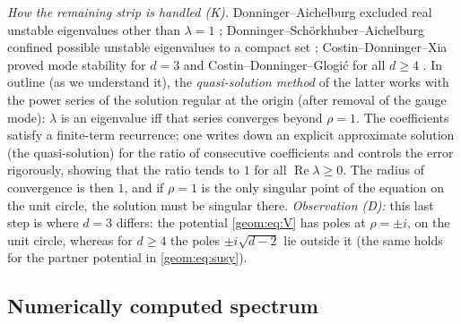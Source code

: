 \emph{How the remaining strip is handled (K).} Donninger--Aichelburg
excluded real unstable eigenvalues other than $\lambda=1$
\cite{DonningerAichelburg2008}; Donninger--Sch\"orkhuber--Aichelburg
confined possible unstable eigenvalues to a compact set
\cite{DonningerSchoerkhuberAichelburg2012}; Costin--Donninger--Xia proved
mode stability for $d=3$ \cite{CostinDonningerXia2016} and
Costin--Donninger--Glogi\'c for all $d\ge4$ \cite{CostinDonningerGlogic2017}.
In outline (as we understand it), the \emph{quasi-solution method} of the
latter works with the power series of the solution regular at the origin
(after removal of the gauge mode): $\lambda$ is an eigenvalue iff that series
converges beyond $\rho=1$. The coefficients satisfy a finite-term
recurrence; one writes down an explicit approximate solution (the
quasi-solution) for the ratio of consecutive coefficients and controls the
error rigorously, showing that the ratio tends to $1$ for all
$\operatorname{Re}\lambda\ge0$. The radius of convergence is then $1$, and if
$\rho=1$ is the only singular point of the equation on the unit circle, the
solution must be singular there. \emph{Observation (D):} this last step is
where $d=3$ differs: the potential \eqref{geom:eq:V} has poles at
$\rho=\pm i$, on the unit circle, whereas for $d\ge4$ the poles
$\pm i\sqrt{d-2}$ lie outside it (the same holds for the partner
potential in \eqref{geom:eq:susy}).

\subsection{Numerically computed spectrum}
\label{geom:sec:wm-num}

